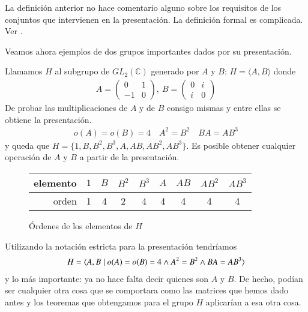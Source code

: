 La definición anterior no hace comentario alguno sobre los requisitos de los conjuntos que intervienen en la presentación. La definición formal es complicada. Ver \cite{defpres}.

Veamos ahora ejemplos de dos grupos importantes dados por su presentación.



\begin{ej}
	\label{ej:grupocuaterniones}
	Llamamos $H$ al subgrupo de $GL_2(\mathbb{C})$ generado por $A$ y $B$: $H = \langle A, B\rangle$ donde 
	\begin{align*}
	A = \left(\begin{array}{cc}
	0 & 1 \\ -1 & 0
	\end{array}\right),\ B = \left(\begin{array}{cc}
	0 & i \\ i & 0
	\end{array}\right)
	\end{align*}
	De probar las multiplicaciones de $A$ y de $B$ consigo mismas y entre ellas se obtiene la presentación.
	\begin{align*}
	o(A) = o(B) = 4\quad A^2 = B^2 \quad BA = AB^3
	\end{align*}
	y queda que $H = \{1, B, B^2, B^3, A, AB, AB^2, AB^3\}$. Es posible obtener cualquier operación de $A$ y $B$ a partir de la presentación.
	
	\begin{figure}[h]
		\centering
		\begin{tabular}{r|cccccccc}
			elemento & $1$ & $B$ & $B^2$ & $B^3$ & $A$ & $AB$ & $AB^2$ & $AB^3$ \\ \hline
			orden   &  1  &  4  &   2   &   4   &  4  &  4   &   4    &   4
		\end{tabular}
		\caption{Órdenes de los elementos de $H$}
	\end{figure}

	Utilizando la notación estricta para la presentación tendríamos
	\begin{align}
		H = \langle A, B \mid o(A) = o(B) = 4 \land A^2=B^2 \land BA = AB^3\rangle
	\end{align}
	y lo más importante: ya no hace falta decir quienes son $A$ y $B$. De hecho, podían ser cualquier otra cosa que se comportara como las matrices que hemos dado antes y los teoremas que obtengamos para el grupo $H$ aplicarían a esa otra cosa.
\end{ej}

